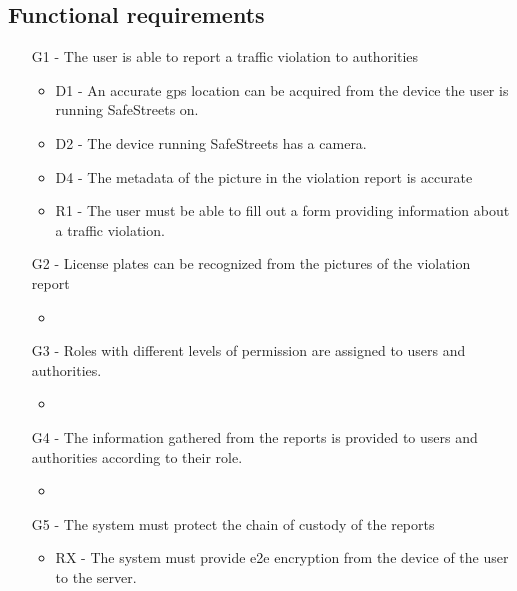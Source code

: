 \subsection{Functional requirements}
\begin{itemize}
\item
[G1] - The user is able to report a traffic violation to authorities
    \begin{itemize}
    \item
    D1 - An accurate gps location can be acquired from the device the user is running SafeStreets on.
    \item
    D2 - The device running SafeStreets has a camera.
    \item
    D4 - The metadata of the picture in the violation report is accurate
    \item
    R1 - The user must be able to fill out a form providing information about a traffic violation.
    \end{itemize}

\item
[G2] - License plates can be recognized from the pictures of the violation report
    \begin{itemize}
    \item
    \end{itemize}

\item
[G3] - Roles with different levels of permission are assigned to users and authorities.
    \begin{itemize}
    \item
    \end{itemize}
\item
[G4] - The information gathered from the reports is provided to users and authorities according to their role.
    \begin{itemize}
    \item
    \end{itemize}

\item
[G5] - The system must protect the chain of custody of the reports 
    \begin{itemize}
    \item
	RX - The system must provide e2e encryption from the device of the user to the server.
    \end{itemize}
	

\end{itemize}
